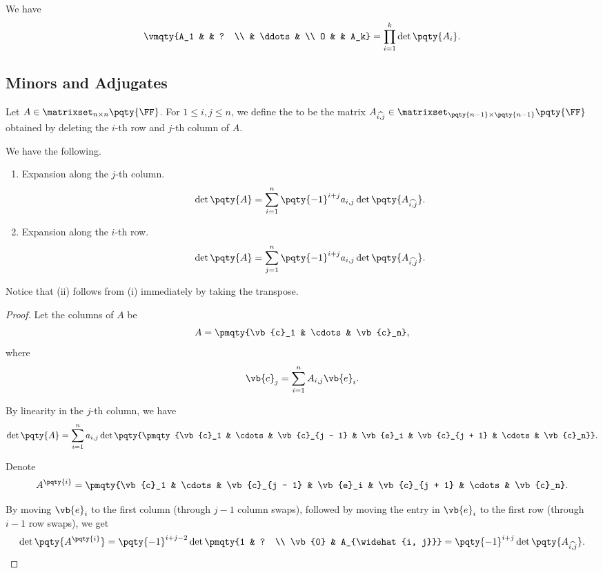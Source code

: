 \begin{corollary}
    We have
    \[
        \vmqty{A_1 & & ? \\ & \ddots &  \\ O & & A_k} = \prod_{i = 1}^{k} \det \pqty{A_i}.
    \]
\end{corollary}

\subsection{Minors and Adjugates}

\begin{definition}
    Let \(A \in \matrixset_{n \times n} \pqty{\FF}\). For \(1 \leq i, j \leq n\), we define the  to be the matrix \(A_{\widehat{i, j}} \in \matrixset_{\pqty{n - 1} \times \pqty{n - 1}} \pqty{\FF}\) obtained by deleting the \(i\)-th row and \(j\)-th column of \(A\).
\end{definition}


\begin{lemma}
    We have the following.

    \begin{enumerate}[label=(\roman*)]
        \item Expansion along the \(j\)-th column.
        \[
            \det\pqty{A} = \sum_{i = 1}^{n} \pqty{-1}^{i + j} a_{i, j} \det\pqty{A_{\widehat{i, j}}}.
        \]
        \item Expansion along the \(i\)-th row.
        \[
            \det\pqty{A} = \sum_{j = 1}^{n} \pqty{-1}^{i + j} a_{i, j} \det\pqty{A_{\widehat{i, j}}}.
        \]
    \end{enumerate}
\end{lemma}

\begin{remark}
    Notice that (ii) follows from (i) immediately by taking the transpose.
\end{remark}

\begin{proof}
    Let the columns of \(A\) be
    \[
        A = \pmqty{\vb{c}_1 & \cdots & \vb{c}_n},
    \]
    where
    \[
        \vb{c}_j = \sum_{i = 1}^{n} A_{i, j} \vb{e}_i.
    \]

    By linearity in the \(j\)-th column, we have
    \[
        \det\pqty{A} = \sum_{i = 1}^{n} a_{i, j} \det\pqty{\pmqty{\vb{c}_1 & \cdots & \vb{c}_{j - 1} & \vb{e}_i & \vb{c}_{j + 1} & \cdots & \vb{c}_n}}.
    \]

    Denote
    \[
        A^{\pqty{i}} = \pmqty{\vb{c}_1 & \cdots & \vb{c}_{j - 1} & \vb{e}_i & \vb{c}_{j + 1} & \cdots & \vb{c}_n}.
    \]

    By moving \(\vb{e}_i\) to the first column (through \(j - 1\) column swaps), followed by moving the entry in \(\vb{e}_i\) to the first row (through \(i - 1\) row swaps), we get
    \[
        \det\pqty{A^{\pqty{i}}} = \pqty{-1}^{i + j - 2} \det \pmqty{1 & ? \\
        \vb{0} & A_{\widehat{i, j}}} = \pqty{-1}^{i + j} \det \pqty{A_{\widehat{i, j}}}.
    \]
\end{proof}

